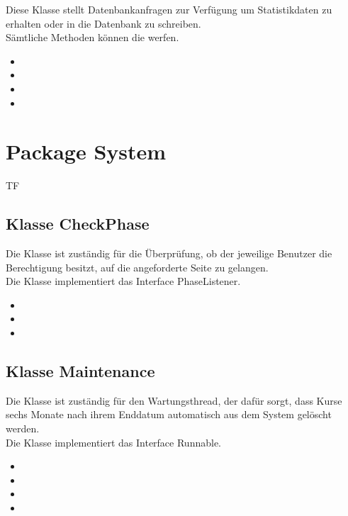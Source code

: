 \documentclass[a4paper]{scrreprt}
\begin{document}
	Diese Klasse stellt Datenbankanfragen zur Verfügung um Statistikdaten zu erhalten oder in die Datenbank
	zu schreiben.\\
	Sämtliche Methoden können die  werfen.
	\begin{itemize}
		\item {}
		\item {}
		\item {}
		\item {}
	\end{itemize}
	
	\section{Package System}
	\begin{tiny}
		TF
	\end{tiny}
	\subsection{Klasse CheckPhase}
	Die Klasse ist zuständig für die Überprüfung, ob der jeweilige Benutzer die Berechtigung besitzt, auf die angeforderte Seite zu gelangen.\\
	Die Klasse implementiert das Interface PhaseListener.
	\begin{itemize}
		\item {}
		\item \override
		\item \override
	\end{itemize}
	
	\subsection{Klasse Maintenance}
	Die Klasse ist zuständig für den Wartungsthread, der dafür sorgt, dass Kurse sechs Monate nach ihrem Enddatum automatisch aus dem System gelöscht werden.\\
	Die Klasse implementiert das Interface Runnable.
	\begin{itemize}
		\item {}
		\item {}
		\item {}
		\item \override
	\end{itemize}
	
\end{document}
